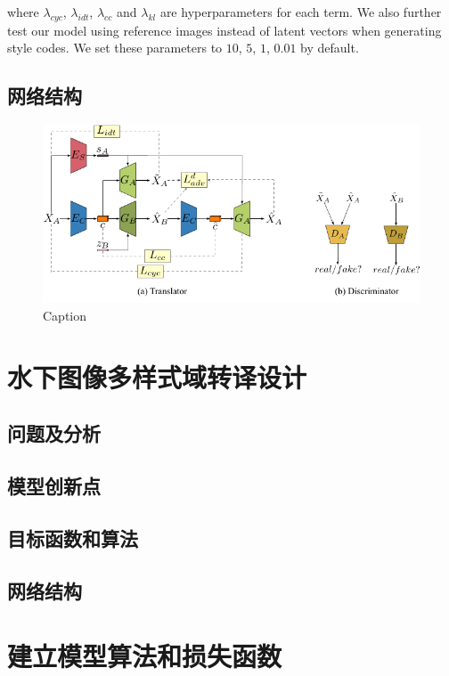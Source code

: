 where $\lambda_{cyc}$, $\lambda_{idt}$, $\lambda_{cc}$ and $\lambda_{kl}$ are hyperparameters for each term. We also further test our model using reference images instead of latent vectors when generating style codes. We set these parameters to $10$, $5$, $1$, $0.01$ by default.

\subsection{网络结构}

\begin{figure}[ht]
    \centering
    \includegraphics[width=1\textwidth]{figures/MUGAN.pdf}
    \caption{Caption}
    \label{fig:my_label}
\end{figure}

\section{水下图像多样式域转译设计}

\subsection{问题及分析}
\subsection{模型创新点}
\subsection{目标函数和算法}
\subsection{网络结构}


\section{建立模型算法和损失函数}
